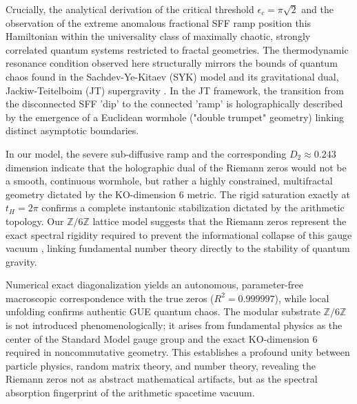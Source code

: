 \documentclass[aps,prl,preprint,superscriptaddress,floatfix]{revtex4-2}
\newcommand{\Zmod}{\mathbb{Z}/6\mathbb{Z}}
\begin{document}
Crucially, the analytical derivation of the critical threshold $\epsilon_c = \pi\sqrt{2}$ and the observation of the extreme anomalous fractional SFF ramp position this Hamiltonian within the universality class of maximally chaotic, strongly correlated quantum systems restricted to fractal geometries. The thermodynamic resonance condition observed here structurally mirrors the bounds of quantum chaos found in the Sachdev-Ye-Kitaev (SYK) model and its gravitational dual, Jackiw-Teitelboim (JT) supergravity \cite{Saad2019}. In the JT framework, the transition from the disconnected SFF 'dip' to the connected 'ramp' is holographically described by the emergence of a Euclidean wormhole ("double trumpet" geometry) linking distinct asymptotic boundaries.

In our model, the severe sub-diffusive ramp and the corresponding $D_2 \approx 0.243$ dimension indicate that the holographic dual of the Riemann zeros would not be a smooth, continuous wormhole, but rather a highly constrained, multifractal geometry dictated by the KO-dimension 6 metric. The rigid saturation exactly at $t_H = 2\pi$ confirms a complete instantonic stabilization dictated by the arithmetic topology. Our $\Zmod$ lattice model suggests that the Riemann zeros represent the exact spectral rigidity required to prevent the informational collapse of this gauge vacuum \cite{Connes2008}, linking fundamental number theory directly to the stability of quantum gravity.

Numerical exact diagonalization yields an autonomous, parameter-free macroscopic correspondence with the true zeros ($R^2 = 0.999997$), while local unfolding confirms authentic GUE quantum chaos. The modular substrate $\Zmod$ is not introduced phenomenologically; it arises from fundamental physics as the center of the Standard Model gauge group and the exact KO-dimension 6 required in noncommutative geometry. This establishes a profound unity between particle physics, random matrix theory, and number theory, revealing the Riemann zeros not as abstract mathematical artifacts, but as the spectral absorption fingerprint of the arithmetic spacetime vacuum.
\end{document}
